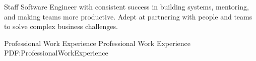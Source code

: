 \documentclass[MMMMyyyy,nonstopmode]{simpleresumecv_stacked}
\newcommand{\comment}[1]{\ignorespaces} %
\begin{document}
\begin{Body}

\item




\begin{center}
Staff Software Engineer with consistent success in building systems, mentoring, and making teams more productive.
Adept at partnering with people and teams to solve complex business challenges.

\end{center}



\Section
{Professional Work Experience}
{Professional Work Experience}
{PDF:ProfessionalWorkExperience}


\end{Body}
\end{document}
